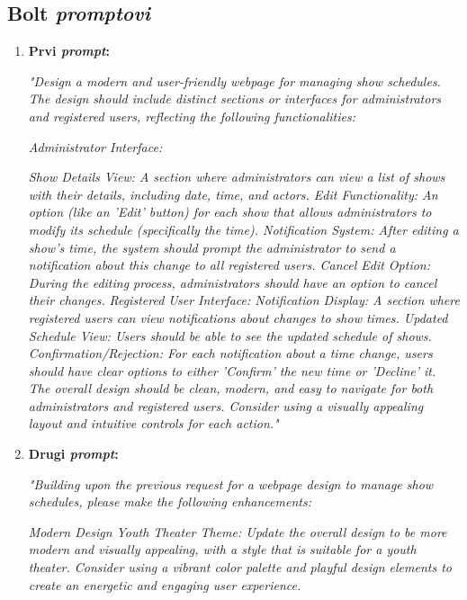 \subsection{Bolt \textit{promptovi}}
\begin{enumerate}  
            \item \textbf{Prvi \textit{prompt}:}
            
            \textit{"Design a modern and user-friendly webpage for managing show schedules. The design should include distinct sections or interfaces for administrators and registered users, reflecting the following functionalities:}
        
            \textit{Administrator Interface:}
            
            \textit{Show Details View: A section where administrators can view a list of shows with their details, including date, time, and actors.
            Edit Functionality: An option (like an 'Edit' button) for each show that allows administrators to modify its schedule (specifically the time).
            Notification System: After editing a show's time, the system should prompt the administrator to send a notification about this change to all registered users.
            Cancel Edit Option: During the editing process, administrators should have an option to cancel their changes.}
            \textit{Registered User Interface:
            Notification Display: A section where registered users can view notifications about changes to show times.
            Updated Schedule View: Users should be able to see the updated schedule of shows.
            Confirmation/Rejection: For each notification about a time change, users should have clear options to either 'Confirm' the new time or 'Decline' it.
            The overall design should be clean, modern, and easy to navigate for both administrators and registered users. Consider using a visually appealing layout and intuitive controls for each action."}


            
            \item \textbf{Drugi \textit{prompt}:}
            
            \textit{"Building upon the previous request for a webpage design to manage show schedules, please make the following enhancements:}

            \textit{Modern Design  Youth Theater Theme: Update the overall design to be more modern and visually appealing, with a style that is suitable for a youth theater. Consider using a vibrant color palette and playful design elements to create an energetic and engaging user experience.}
            

\end{enumerate}
